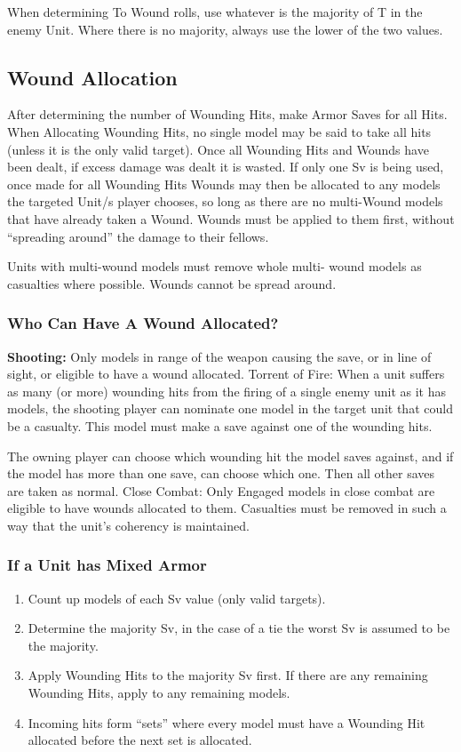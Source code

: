 When determining To Wound rolls, use whatever is the
majority of T in the enemy Unit. Where there is no majority,
always use the lower of the two values.


\subsection{Wound Allocation}
After determining the number of Wounding Hits, make Armor
Saves for all Hits. When Allocating Wounding Hits, no single
model may be said to take all hits (unless it is the only valid
target). Once all Wounding Hits and Wounds have been dealt,
if excess damage was dealt it is wasted. If only one Sv is being
used, once made for all Wounding Hits Wounds may then be
allocated to any models the targeted Unit/s player chooses, so
long as there are no multi-Wound models that have already
taken a Wound. Wounds must be applied to them first, without
“spreading around” the damage to their fellows.

Units with multi-wound models must remove whole multi-
wound models as casualties where possible. Wounds cannot
be spread around.

\subsubsection{Who Can Have A Wound Allocated?}
{\bfseries Shooting:} Only models in range of the weapon causing the
save, or in line of sight, or eligible to have a wound allocated.
Torrent of Fire: When a unit suffers as many (or more)
wounding hits from the firing of a single enemy unit as it has
models, the shooting player can nominate one model in the
target unit that could be a casualty. This model must make a
save against one of the wounding hits.

The owning player can choose which wounding hit the model
saves against, and if the model has more than one save, can
choose which one. Then all other saves are taken as normal.
Close Combat: Only Engaged models in close combat are
eligible to have wounds allocated to them.
Casualties must be removed in such a way that the unit's
coherency is maintained.

\subsubsection{If a Unit has Mixed Armor}
\begin{enumerate}
\item Count up models of each Sv value (only valid targets).
\item Determine the majority Sv, in the case of a tie the worst
Sv is assumed to be the majority.
\item Apply Wounding Hits to the majority Sv first. If there are
any remaining Wounding Hits, apply to any remaining
models.
\item Incoming hits form “sets” where every model must have
a Wounding Hit allocated before the next set is allocated.
\end{enumerate}

